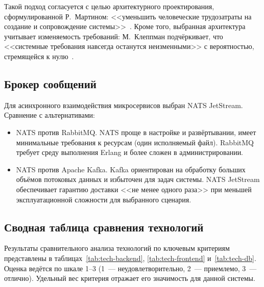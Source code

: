 Такой подход согласуется с целью архитектурного проектирования, сформулированной
Р.~Мартином: <<уменьшить человеческие трудозатраты на создание и сопровождение
системы>>~\cite{martin2018}. Кроме того, выбранная архитектура учитывает
изменяемость требований: М.~Клеппман подчёркивает, что <<системные требования
навсегда останутся неизменными>> с вероятностью, стремящейся к нулю~\cite{kleppmann2017}.

\subsection{Брокер сообщений}

Для асинхронного взаимодействия микросервисов выбран NATS JetStream. Сравнение с альтернативами:
\begin{itemize}
  \item NATS против RabbitMQ. NATS проще в настройке и развёртывании, имеет минимальные требования к ресурсам (один исполняемый файл). RabbitMQ требует среду выполнения Erlang и более сложен в администрировании.
  \item NATS против Apache Kafka. Kafka ориентирован на обработку больших объёмов
    потоковых данных и избыточен для задач системы. NATS JetStream обеспечивает
    гарантию доставки <<не менее одного раза>> при меньшей эксплуатационной
    сложности для выбранного сценария.
\end{itemize}

\subsection{Сводная таблица сравнения технологий}

Результаты сравнительного анализа технологий по ключевым критериям представлены в таблицах~\ref{tab:tech-backend}, \ref{tab:tech-frontend} и~\ref{tab:tech-db}. Оценка ведётся по шкале 1--3 (1~--- неудовлетворительно, 2~--- приемлемо, 3~--- отлично). Удельный вес критерия отражает его значимость для данной системы.

